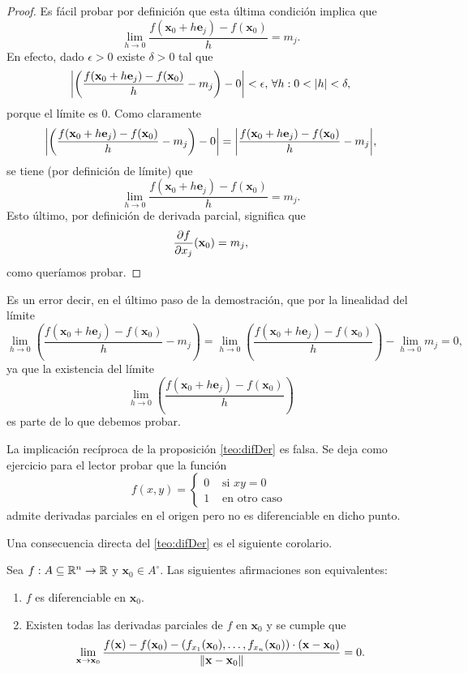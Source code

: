 \begin{proof}
Es f\'acil probar por definici\'on que esta \'ultima condici\'on implica que
\[
 \lim_{h \to 0} \frac{ f(\mathbf{x}_0 + h \mathbf{e}_j) - f(\mathbf{x}_0) }{h} = m_j.
\]
En efecto, dado $\epsilon > 0$ existe $\delta > 0$ tal que 
\[
 \abs{ \left( \frac{ f(\mathbf{x}_0 + h \mathbf{e}_j) - f(\mathbf{x}_0) }{h} - m_j \right) - 0 } < \epsilon, \, \forall h : 0 < \abs{h} < \delta,
\]
porque el l\'imite es 0. Como claramente 
\[
 \abs{ \left( \frac{ f(\mathbf{x}_0 + h \mathbf{e}_j) - f(\mathbf{x}_0) }{h} - m_j \right) - 0 } = 
 \abs{\frac{ f(\mathbf{x}_0 + h \mathbf{e}_j) - f(\mathbf{x}_0) }{h} - m_j},
\]
se tiene (por definici\'on de l\'imite) que 
\[
 \lim_{h \to 0} \frac{ f(\mathbf{x}_0 + h \mathbf{e}_j) - f(\mathbf{x}_0) }{h} = m_j.
\]
Esto \'ultimo, por definici\'on de derivada parcial, significa que
\[
  \dfrac{\partial f}{\partial x_j} (\mathbf{x}_0) = m_j,
\]
como quer\'iamos probar. 
\end{proof}


\begin{obs}
 Es un error decir, en el \'ultimo paso de la demostraci\'on, que por la linealidad del l\'imite
 \[
  \lim_{h \to 0} \left( \frac{f(\mathbf{x}_0 + h \mathbf{e}_j) - f(\mathbf{x}_0)}{h} - m_j \right) = 
  \lim_{h \to 0} \left( \frac{f(\mathbf{x}_0 + h \mathbf{e}_j) - f(\mathbf{x}_0)}{h} \right) - \lim_{h \to 0} m_j = 0,
 \]
ya que la existencia del l\'imite 
\[
\lim_{h \to 0} \left( \frac{f(\mathbf{x}_0 + h \mathbf{e}_j) - f(\mathbf{x}_0)}{h} \right)
\]
es parte de lo que debemos probar.
\end{obs}





\begin{obs} La implicaci\'on rec\'iproca de la proposici\'on \eqref{teo:difDer} es falsa. Se deja como ejercicio para el lector probar que  la funci\'on  
 \[
        f(x,y) = 
        \begin{cases}
         0 & \text{ si } x y = 0  \\
         1 & \text{ en otro caso }
        \end{cases}
\]admite  derivadas parciales en el origen  pero no es diferenciable en dicho punto.
\end{obs}






Una consecuencia directa del \autoref{teo:difDer} es el siguiente corolario.


\begin{corollary}
Sea $f: A \subseteq \mathbb{R}^n \to \mathbb{R}$ y $\mathbf{x}_0 \in A^{\circ}$. Las siguientes afirmaciones son equivalentes:
\begin{enumerate}
  \item $f$ es diferenciable en $\mathbf{x}_0$.
  \item Existen todas las derivadas parciales de $f$ en $\mathbf{x}_0$ y se cumple que
  \[
   \lim_{\mathbf{x} \to \mathbf{x}_0} \frac{f(\mathbf{x}) - f(\mathbf{x}_0) - (f_{x_1}(\mathbf{x}_0), \dots, f_{x_n}(\mathbf{x}_0)) \cdot (\mathbf{x} - \mathbf{x}_0)}{\norm{\mathbf{x} - \mathbf{x}_0}} = 0.
  \]
\end{enumerate}
\end{corollary}


